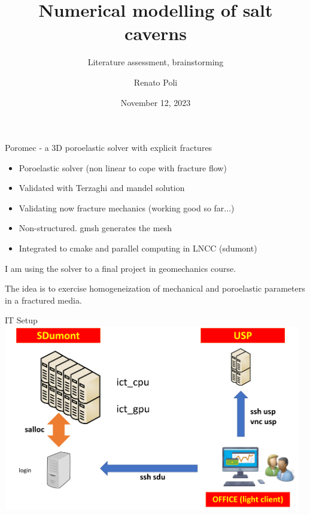 

\usepackage{graphicx}
\graphicspath{ {../multimedia/} }


\title[Num modelling of salt caverns]{Numerical modelling of salt caverns}
\subtitle{Literature assessment, brainstorming}
\author[RPoli]{Renato Poli}
\date{November 12, 2023}



\maketitle


\begin{frame}{Poromec - a 3D poroelastic solver with explicit fractures}
\begin{itemize}
	\item Poroelastic solver (non linear to cope with fracture flow)
	\item Validated with Terzaghi and mandel solution
	\item Validating now fracture mechanics (working good so far...)
	\item Non-structured. gmsh generates the mesh
	\item Integrated to cmake and parallel computing in LNCC (sdumont)
\end{itemize}
\vspace{10pt}
I am using the solver to a final project in geomechanics course.

The idea is to exercise homogeneization of mechanical and poroelastic parameters in a fractured media.
\end{frame}

\begin{frame}{IT Setup}
\includegraphics[width=13cm]{png/it_archit}
\end{frame}

